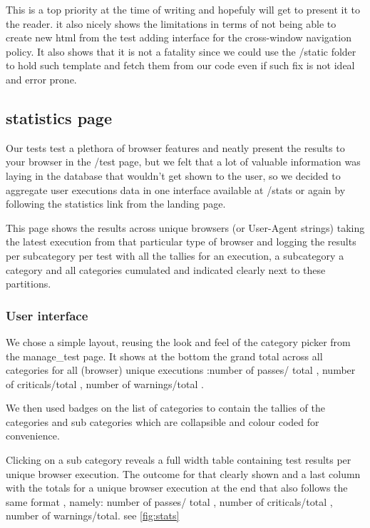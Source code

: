 This is a top priority at the time of writing and hopefuly will get to present it to the reader. it also nicely
shows the limitations in terms of not being able to create new html from the test adding interface for the cross-window navigation policy.
It also shows that it is not a fatality since we could use the /static folder to hold such template and fetch them from 
our code even if such fix is not ideal and error prone.

\subsection{statistics page}

Our tests test a plethora of browser features and neatly present the results to your browser in the /test page, but we felt that a lot of valuable information
was laying in the database that wouldn't get shown to the user, so we decided to aggregate user executions data in one interface available at /stats or again
by following the statistics link from the landing page.

This page shows the results across unique browsers (or User-Agent strings) taking the latest execution from that particular type of browser and logging the results
per subcategory per test with all the tallies for an execution, a subcategory a category and all categories cumulated and indicated clearly next to these partitions.

\subsubsection{User interface}

We chose a simple layout, reusing the look and feel of the category picker from the manage\_test page. It shows at the bottom the grand total across all categories
for all (browser) unique executions :number of passes/ total , number of criticals/total , number of warnings/total .

We then used badges on the list of categories to contain the tallies of the categories and sub categories which are collapsible and colour coded for convenience.

Clicking on a sub category reveals a full width table containing test results per unique browser execution. The outcome for that clearly shown and a last column
with the totals for a unique browser execution at the end that also follows the same format , namely: number of passes/ total , number of criticals/total , number of warnings/total.
see \ref{fig:stats}

